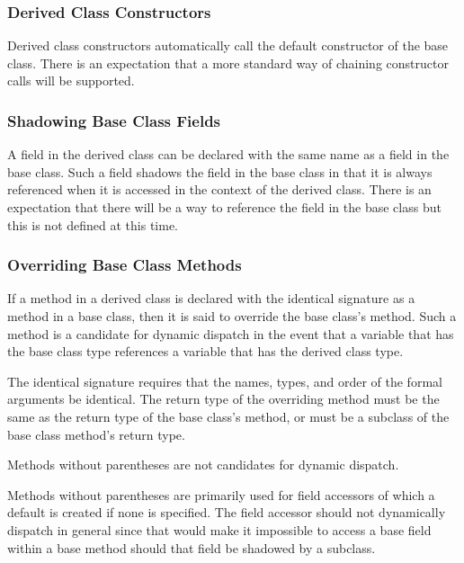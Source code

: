 \subsubsection{Derived Class Constructors}
\label{Derived_Class_Constructors}

Derived class constructors automatically call the default constructor
of the base class.  There is an expectation that a more standard way
of chaining constructor calls will be supported.

\subsubsection{Shadowing Base Class Fields}
\label{Shadowing_Base_Class_Fields}

A field in the derived class can be declared with the same name as a
field in the base class.  Such a field shadows the field in the base
class in that it is always referenced when it is accessed in the
context of the derived class.  There is an expectation that there will
be a way to reference the field in the base class but this is not
defined at this time.

\subsubsection{Overriding Base Class Methods}
\label{Overriding_Base_Class_Methods}

If a method in a derived class is declared with the identical
signature as a method in a base class, then it is said to override the
base class's method.  Such a method is a candidate for dynamic
dispatch in the event that a variable that has the base class type
references a variable that has the derived class type.

The identical signature requires that the names, types, and order of
the formal arguments be identical. The return type of the overriding
method must be the same as the return type of the base class's method,
or must be a subclass of the base class method's return type.

Methods without parentheses are not candidates for dynamic dispatch.
\begin{rationale}
Methods without parentheses are primarily used for field accessors of
which a default is created if none is specified.  The field accessor
should not dynamically dispatch in general since that would make it
impossible to access a base field within a base method should that
field be shadowed by a subclass.
\end{rationale}

